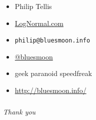 \documentclass{beamer}
\newcommand{\innersplash}[1]{
  \begin{center}
    \large \textrm{\textit{ #1 } }
  \end{center}
}
\newcommand{\splashslide}[2][{}]{
  \begin{frame}
  \frametitle{#1}
  \innersplash{#2}
  \end{frame}
}
\begin{document}
\begin{frame}
  \begin{itemize}
  \item Philip Tellis
  \item \href{http://lognormal.com/}{LogNormal.com}
  \item \small{\texttt{philip@bluesmoon.info}}
  \item \href{http://twitter.com/bluesmoon}{@bluesmoon}
  \item geek paranoid speedfreak
  \item \href{http://bluesmoon.info/}{http://bluesmoon.info/}
  \end{itemize}
\end{frame}

\splashslide{\Huge Thank you }
\end{document}
